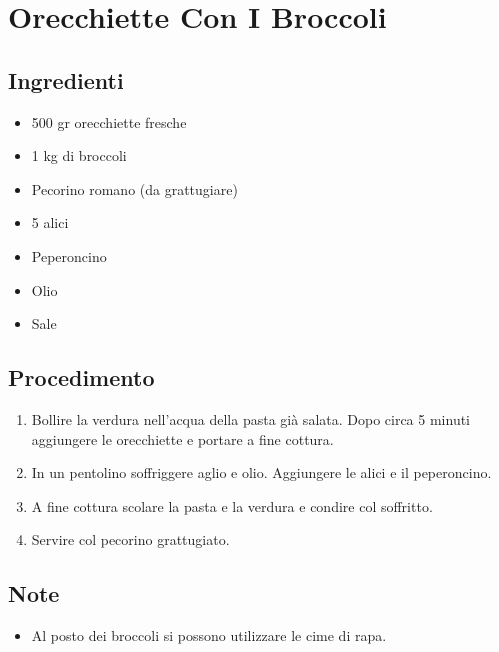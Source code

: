 \section{Orecchiette Con I Broccoli}
\subsection{Ingredienti}
\begin{itemize}
\item 500 gr orecchiette fresche  
\item 1 kg di broccoli  
\item Pecorino romano (da grattugiare)  
\item 5 alici   
\item Peperoncino   
\item Olio  
\item Sale
\end{itemize}
\subsection{Procedimento}
\begin{enumerate}
\item  Bollire la verdura nell'acqua della pasta già salata. Dopo circa 5 minuti aggiungere le orecchiette e portare a fine cottura.  
\item  In un pentolino soffriggere aglio e olio. Aggiungere le alici e il peperoncino.  
\item  A fine cottura scolare la pasta e la verdura e condire col soffritto.  
\item  Servire col pecorino grattugiato.
\end{enumerate}
\subsection{Note}
\begin{itemize}
\item Al posto dei broccoli si possono utilizzare le cime di rapa.
\end{itemize}

